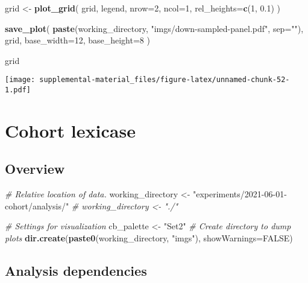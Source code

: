 \documentclass[]{book}
\newenvironment{Shaded}{\begin{snugshade}}{\end{snugshade}}
\newcommand{\CommentTok}[1]{\textcolor[rgb]{0.56,0.35,0.01}{\textit{#1}}}
\newcommand{\DataTypeTok}[1]{\textcolor[rgb]{0.13,0.29,0.53}{#1}}
\newcommand{\DecValTok}[1]{\textcolor[rgb]{0.00,0.00,0.81}{#1}}
\newcommand{\FloatTok}[1]{\textcolor[rgb]{0.00,0.00,0.81}{#1}}
\newcommand{\KeywordTok}[1]{\textcolor[rgb]{0.13,0.29,0.53}{\textbf{#1}}}
\newcommand{\NormalTok}[1]{#1}
\newcommand{\OtherTok}[1]{\textcolor[rgb]{0.56,0.35,0.01}{#1}}
\newcommand{\StringTok}[1]{\textcolor[rgb]{0.31,0.60,0.02}{#1}}
\begin{document}
\begin{Shaded}
\begin{Highlighting}[]
\NormalTok{grid <-}\StringTok{ }\KeywordTok{plot_grid}\NormalTok{(}
\NormalTok{  grid,}
\NormalTok{  legend,}
  \DataTypeTok{nrow=}\DecValTok{2}\NormalTok{,}
  \DataTypeTok{ncol=}\DecValTok{1}\NormalTok{,}
  \DataTypeTok{rel_heights=}\KeywordTok{c}\NormalTok{(}\DecValTok{1}\NormalTok{, }\FloatTok{0.1}\NormalTok{)}
\NormalTok{)}

\KeywordTok{save_plot}\NormalTok{(}
  \KeywordTok{paste}\NormalTok{(working_directory, }\StringTok{"imgs/down-sampled-panel.pdf"}\NormalTok{, }\DataTypeTok{sep=}\StringTok{""}\NormalTok{),}
\NormalTok{  grid,}
  \DataTypeTok{base_width=}\DecValTok{12}\NormalTok{,}
  \DataTypeTok{base_height=}\DecValTok{8}
\NormalTok{)}

\NormalTok{grid}
\end{Highlighting}
\end{Shaded}

\texttt{[image: supplemental-material\_files/figure-latex/unnamed-chunk-52-1.pdf]}

\hypertarget{cohort-lexicase}{%
\chapter{Cohort lexicase}\label{cohort-lexicase}}

\hypertarget{overview-5}{%
\section{Overview}\label{overview-5}}

\begin{Shaded}
\begin{Highlighting}[]
\CommentTok{# Relative location of data.}
\NormalTok{working_directory <-}\StringTok{ "experiments/2021-06-01-cohort/analysis/"}
\CommentTok{# working_directory <- "./"}

\CommentTok{# Settings for visualization}
\NormalTok{cb_palette <-}\StringTok{ "Set2"}
\CommentTok{# Create directory to dump plots}
\KeywordTok{dir.create}\NormalTok{(}\KeywordTok{paste0}\NormalTok{(working_directory, }\StringTok{"imgs"}\NormalTok{), }\DataTypeTok{showWarnings=}\OtherTok{FALSE}\NormalTok{)}
\end{Highlighting}
\end{Shaded}

\hypertarget{analysis-dependencies-5}{%
\section{Analysis dependencies}\label{analysis-dependencies-5}}
\end{document}
